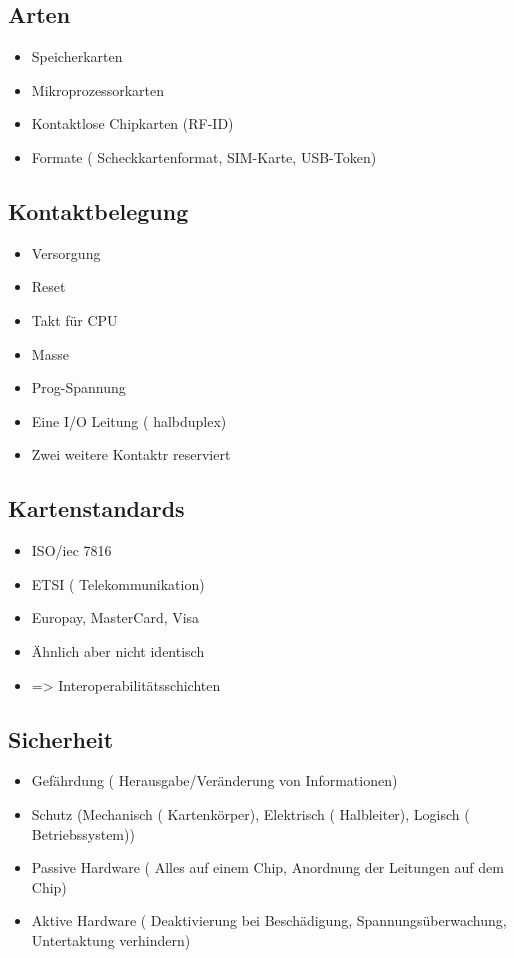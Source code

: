 \subsection*{  Arten }
\begin{itemize}
	\item Speicherkarten
	\item Mikroprozessorkarten
	\item Kontaktlose Chipkarten (RF-ID)
	\item Formate ( Scheckkartenformat, SIM-Karte, USB-Token)
\end{itemize}

\subsection*{  Kontaktbelegung }
\begin{itemize}
	\item Versorgung 
	\item Reset
	\item Takt für CPU
	\item Masse
	\item Prog-Spannung
	\item Eine I/O Leitung ( halbduplex)
	\item Zwei weitere Kontaktr reserviert 
\end{itemize}

\subsection*{  Kartenstandards }
\begin{itemize}
	\item ISO/iec 7816
	\item ETSI ( Telekommunikation)
	\item Europay, MasterCard, Visa
	\item Ähnlich aber nicht identisch
	\item => Interoperabilitätsschichten
\end{itemize}


\subsection*{  Sicherheit }
\begin{itemize}
	\item Gefährdung ( Herausgabe/Veränderung von Informationen) 
	\item Schutz (Mechanisch ( Kartenkörper), Elektrisch ( Halbleiter), Logisch ( Betriebssystem))
	\item Passive Hardware ( Alles auf einem Chip, Anordnung der Leitungen auf dem Chip)
	\item Aktive Hardware ( Deaktivierung bei Beschädigung, Spannungsüberwachung, Untertaktung verhindern)
\end{itemize}

